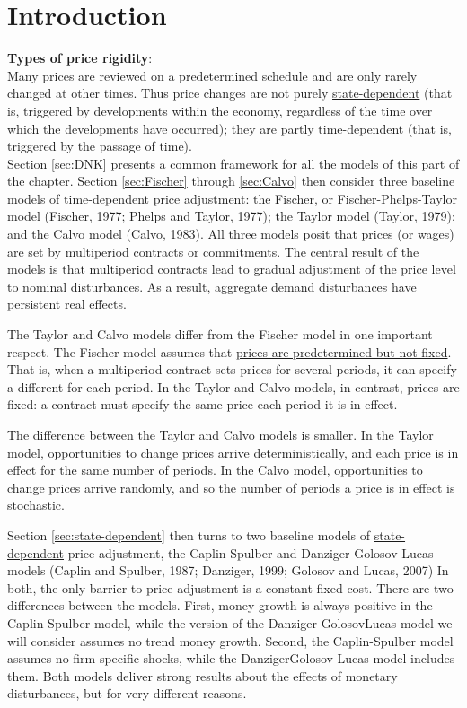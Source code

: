 \documentclass[10pt]{article}
\title{}
\author{}
\date{}
\begin{document}
\tableofcontents
\newpage

\section{Introduction}
{\textbf {Types of price rigidity}}:\\

Many prices are reviewed on a predetermined schedule and are only rarely changed at other times.
Thus price changes are not purely {\underline {state-dependent}} (that is, triggered by developments 
within the economy, regardless of the time over which the developments have occurred); they are partly
{\underline {time-dependent}} (that is, triggered by the passage of time).
\\


Section \ref{sec:DNK} presents a common framework for all the models of this part of the chapter.
Section \ref{sec:Fischer} through \ref{sec:Calvo} then consider three baseline models of 
{\underline {time-dependent}} price adjustment:
the Fischer, or Fischer-Phelps-Taylor model (Fischer, 1977; Phelps and Taylor, 1977); the Taylor
model (Taylor, 1979); and the Calvo model (Calvo, 1983). All three models posit that prices
(or wages) are set by multiperiod contracts or commitments. The central result of the models is that
multiperiod contracts lead to gradual adjustment of the price level to nominal disturbances. As a
result, {\underline {aggregate demand disturbances have persistent real effects.}}

The Taylor and Calvo models differ from the Fischer model in one important respect. The Fischer model
assumes that {\underline {prices are predetermined but not fixed}}. That is, when a multiperiod
contract sets prices for several periods, it can specify a different for each period. In the 
Taylor and Calvo models, in contrast, prices are fixed: a contract must specify the same price each
period it is in effect.

The difference between the Taylor and Calvo models is smaller. In the Taylor model, opportunities to
change prices arrive deterministically, and each price is in effect for the same number of periods.
In the Calvo model, opportunities to change prices arrive randomly, and so the number of periods
a price is in effect is stochastic.

Section \ref{sec:state-dependent} then turns to two baseline models of {\underline {state-dependent}}
price adjustment, the Caplin-Spulber and Danziger-Golosov-Lucas models (Caplin and Spulber, 1987;
Danziger, 1999; Golosov and Lucas, 2007) In both, the only barrier to price adjustment is a constant
fixed cost. There are two differences between the models. First, money growth is always positive in the Caplin-Spulber model, while the version of the Danziger-GolosovLucas model we will consider assumes no trend money growth. Second, the Caplin-Spulber model assumes no firm-specific shocks, while the DanzigerGolosov-Lucas model includes them. Both models deliver strong results about the effects of monetary disturbances, but for very different reasons.
\end{document}
